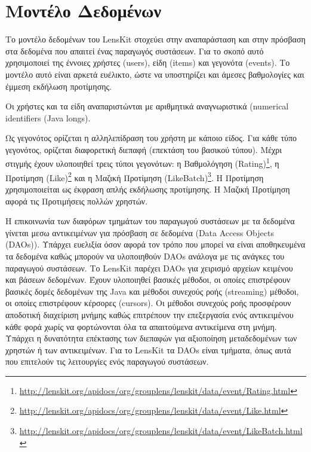\section{Μοντέλο Δεδομένων}
Το μοντέλο δεδομένων του {\en LensKit} στοχεύει στην αναπαράσταση και στην πρόσβαση στα δεδομένα που απαιτεί ένας παραγωγός συστάσεων. Για το σκοπό αυτό χρησιμοποιεί της έννοιες χρήστες ({\en users}), είδη ({\en items}) και γεγονότα ({\en events}). Το μοντέλο αυτό είναι αρκετά ευέλικτο, ώστε να υποστηρίζει και άμεσες βαθμολογίες και έμμεση εκδήλωση προτίμησης. \par
Οι χρήστες και τα είδη αναπαριστώνται με αριθμητικά αναγνωριστικά ({\en numerical identifiers (Java longs)}. \par
Ως γεγονότος ορίζεται η αλληλεπίδραση του χρήστη με κάποιο είδος. Για κάθε τύπο γεγονότος, ορίζεται διαφορετική διεπαφή (επεκτάση του βασικού τύπου). Μέχρι στιγμής έχουν υλοποιηθεί τρεις τύποι γεγονότων: η Βαθμολόγηση ({\en Rating})\footnote{\en \url{http://lenskit.org/apidocs/org/grouplens/lenskit/data/event/Rating.html}}, η Προτίμηση ({\en Like})\footnote{\en \url{http://lenskit.org/apidocs/org/grouplens/lenskit/data/event/Like.html}} και η Μαζική Προτίμηση ({\en LikeBatch})\footnote{\en \url{http://lenskit.org/apidocs/org/grouplens/lenskit/data/event/LikeBatch.html}}. Η Προτίμηση χρησιμοποιείται ως έκφραση απλής εκδήλωσης προτίμησης. Η Μαζική Προτίμηση αφορά τις Προτιμήσεις πολλών χρηστών. \par
Η επικοινωνία των διαφόρων τμημάτων του παραγωγού συστάσεων με τα δεδομένα γίνεται μεσω αντικειμένων για πρόσβαση σε δεδομένα ({\en Data Access Objects (DAOs))}. Υπάρχει ευελιξία όσον αφορά τον τρόπο που μπορεί να είναι αποθηκευμένα τα δεδομένα καθώς μπορούν να υλοποιηθούν {\en DAOs} ανάλογα με τις ανάγκες του παραγωγού συστάσεων. Το {\en LensKit} παρέχει {\en DAOs} για χειρισμό αρχείων κειμένου και βάσεων δεδομένων. Έχουν υλοποιηθεί βασικές μέθοδοι, οι οποίες επιστρέφουν βασικές δομές δεδομένων της {\en Java} και μέθοδοι συνεχούς ροής ({\en streaming}) μέθοδοι, οι οποίες επιστρέφουν κέρσορες ({\en cursors}). Οι μέθοδοι συνεχούς ροής προσφέρουν αποδοτική διαχείριση μνήμης καθώς επιτρέπουν την επεξεργασία ενός αντικειμένου κάθε φορά χωρίς να φορτώνονται όλα τα απαιτούμενα αντικείμενα στη μνήμη. Υπάρχει η δυνατότητα επέκτασης των διεπαφών για αξιοποίηση μεταδεδομένων των χρηστών ή των αντικειμένων. Για το {\en LensKit} τα \en DAOs \el είναι τμήματα, όπως αυτά που επιτελούν τις λειτουργίες ενός παραγωγού συστάσεων.
